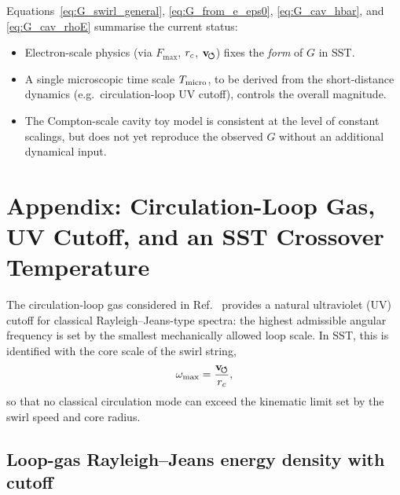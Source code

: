 \documentclass[11pt]{article}
\begin{document}
            Equations~\eqref{eq:G_swirl_general}, \eqref{eq:G_from_e_eps0},
            \eqref{eq:G_cav_hbar}, and \eqref{eq:G_cav_rhoE} summarise the current
            status:

            \begin{itemize}
                \item Electron-scale physics (via $F_{\max}$, $r_c$, $\mathbf{v}_{\!\boldsymbol{\circlearrowleft}}$) fixes
                the \emph{form} of $G$ in SST.
                \item A single microscopic time scale $T_{\rm micro}$, to be derived
                from the short-distance dynamics (e.g.\ circulation-loop UV
                cutoff), controls the overall magnitude.
                \item The Compton-scale cavity toy model is consistent at the level
                of constant scalings, but does not yet reproduce the observed
                $G$ without an additional dynamical input.
            \end{itemize}

    \section{Appendix: Circulation-Loop Gas, UV Cutoff, and an SST Crossover Temperature}
        \label{sec:T_SST_loopgas}

        The circulation-loop gas considered in
        Ref.~\cite{IskandaraniLoopGas} provides a natural ultraviolet (UV)
        cutoff for classical Rayleigh--Jeans-type spectra: the highest
        admissible angular frequency is set by the smallest mechanically
        allowed loop scale.  In SST, this is identified with the core scale of
        the swirl string,
        \begin{equation}
            \omega_{\max}
            = \frac{\mathbf{v}_{\!\boldsymbol{\circlearrowleft}}}{r_c},
            \label{eq:omega_max_def}
        \end{equation}
        so that no classical circulation mode can exceed the kinematic limit
        set by the swirl speed and core radius.

        \subsection{Loop-gas Rayleigh--Jeans energy density with cutoff}
\end{document}
